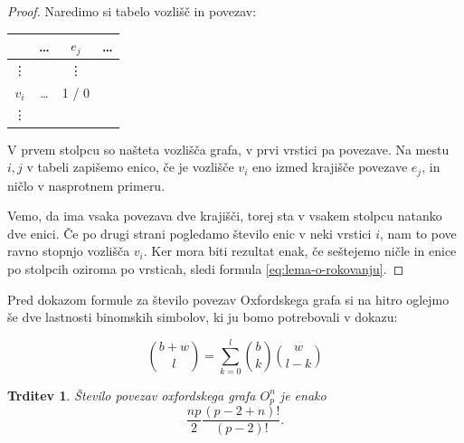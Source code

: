 \documentclass[11pt,a4paper]{article}
\theoremstyle{definition} %
\theoremstyle{plain} %
\newtheorem{trditev}[definicija]{Trditev}
\begin{document}
\begin{proof}
    \small
    Naredimo si tabelo vozlišč in povezav:
    
    \begin{table}[h]
        \centering
        \begin{tabular}{c|ccc}
            & \ldots & $e_j$ & \ldots \\ \hline
            \vdots & & \vdots & \\
            $v_i$ & \ldots & 1 / 0 & \\
            \vdots & & &
        \end{tabular}
    \end{table}
    
    V prvem stolpcu so našteta vozlišča grafa, v prvi vrstici pa povezave. Na mestu $i,j$ v tabeli zapišemo enico, če je vozlišče $v_i$ eno izmed krajišče povezave $e_j$, in ničlo v nasprotnem primeru. 
    
    Vemo, da ima vsaka povezava dve krajišči, torej sta v vsakem stolpcu natanko dve enici. Če po drugi strani pogledamo število enic v neki vrstici $i$, nam to pove ravno stopnjo vozlišča $v_i$. Ker mora biti rezultat enak, če seštejemo ničle in enice po stolpcih oziroma po vrsticah, sledi formula \eqref{eq:lema-o-rokovanju}.
\end{proof}

Pred dokazom formule za število povezav Oxfordskega grafa si na hitro oglejmo še dve lastnosti binomskih simbolov, ki ju bomo potrebovali v dokazu:

\begin{equation}
    \label{eq:binom}
    {b+w \choose l} = \sum_{k=0}^{l}{b \choose k}{w \choose l-k}
\end{equation}

\begin{trditev}
	Število povezav oxfordskega grafa $O^n_p$ je enako
	\[ \frac{np}{2} \frac{(p-2+n)!}{(p-2)!} .\]
\end{trditev}
\end{document}
